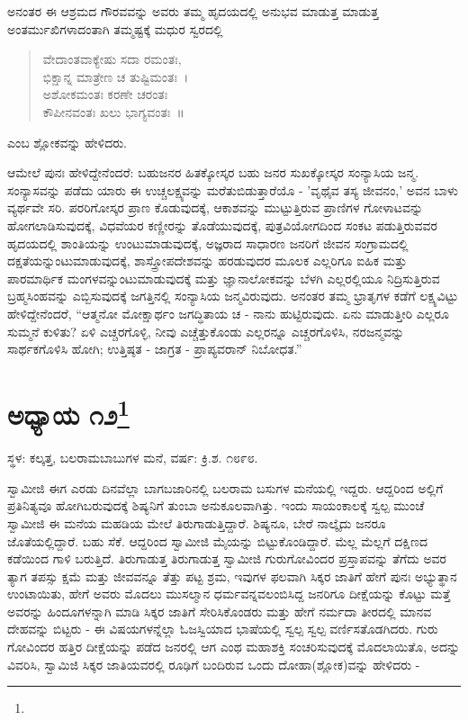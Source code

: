 ಅನಂತರ ಈ ಆಶ್ರಮದ ಗೌರವವನ್ನು ಅವರು ತಮ್ಮ ಹೃದಯದಲ್ಲಿ ಅನುಭವ ಮಾಡುತ್ತ ಮಾಡುತ್ತ ಅಂತರ್ಮುಖಿಗಳಾದಂತಾಗಿ ತಮ್ಮಷ್ಟಕ್ಕೆ ಮಧುರ ಸ್ವರದಲ್ಲಿ

\begin{verse}
ವೇದಾಂತವಾಕ್ಯೇಷು ಸದಾ ರಮಂತಃ,\\ಭಿಕ್ಷಾನ್ನ ಮಾತ್ರೇಣ ಚ ತುಷ್ಟಿಮಂತಃ~।\\ಅಶೋಕಮಂತಃ ಕರಣೇ ಚರಂತಃ\\ಕೌಪೀನವಂತಃ ಖಲು ಭಾಗ್ಯವಂತಃ~॥
\end{verse}

ಎಂಬ ಶ್ಲೋಕವನ್ನು ಹೇಳಿದರು.

ಆಮೇಲೆ ಪುನಃ ಹೇಳಿದ್ದೇನೆಂದರೆ: ಬಹುಜನರ ಹಿತಕ್ಕೋಸ್ಕರ ಬಹು ಜನರ ಸುಖಕ್ಕೋಸ್ಕರ ಸಂನ್ಯಾಸಿಯ ಜನ್ಮ. ಸಂನ್ಯಾಸವನ್ನು ಪಡೆದು ಯಾರು ಈ ಉಚ್ಚಲಕ್ಷ್ಯವನ್ನು ಮರೆತುಬಿಡುತ್ತಾರೆಯೊ - 'ವೃಥೈವ ತಸ್ಯ ಜೀವನಂ,' ಅವನ ಬಾಳು ವ್ಯರ್ಥವೇ ಸರಿ. ಪರರಿಗೋಸ್ಕರ ಪ್ರಾಣ ಕೊಡುವುದಕ್ಕೆ, ಆಕಾಶವನ್ನು ಮುಟ್ಟುತ್ತಿರುವ ಪ್ರಾಣಿಗಳ ಗೋಳಾಟವನ್ನು ಹೋಗಲಾಡಿಸುವುದಕ್ಕೆ, ವಿಧವೆಯರ ಕಣ್ಣೀರನ್ನು ತೊಡೆಯುವುದಕ್ಕೆ, ಪುತ್ರವಿಯೋಗದಿಂದ ಸಂಕಟ ಪಡುತ್ತಿರುವವರ ಹೃದಯದಲ್ಲಿ ಶಾಂತಿಯನ್ನು ಉಂಟುಮಾಡುವುದಕ್ಕೆ, ಅಜ್ಞರಾದ ಸಾಧಾರಣ ಜನರಿಗೆ ಜೀವನ ಸಂಗ್ರಾಮದಲ್ಲಿ ದಕ್ಷತೆಯನ್ನುಂಟುಮಾಡುವುದಕ್ಕೆ, ಶಾಸ್ತ್ರೋಪದೇಶವನ್ನು ಹರಡುವುದರ ಮೂಲಕ ಎಲ್ಲರಿಗೂ ಐಹಿಕ ಮತ್ತು ಪಾರಮಾರ್ಥಿಕ ಮಂಗಳವನ್ನುಂಟುಮಾಡುವುದಕ್ಕೆ ಮತ್ತು ಜ್ಞಾನಾಲೋಕವನ್ನು ಬೆಳಗಿ ಎಲ್ಲರಲ್ಲಿಯೂ ನಿದ್ರಿಸುತ್ತಿರುವ ಬ್ರಹ್ಮಸಿಂಹವನ್ನು ಎಬ್ಬಿಸುವುದಕ್ಕೆ ಜಗತ್ತಿನಲ್ಲಿ ಸಂನ್ಯಾಸಿಯ ಜನ್ಮವಿರುವುದು. ಅನಂತರ ತಮ್ಮ ಭ್ರಾತೃಗಳ ಕಡೆಗೆ ಲಕ್ಷ್ಯವಿಟ್ಟು ಹೇಳಿದ್ದೇನೆಂದರೆ, “ಆತ್ಮನೋ ಮೋಕ್ಷಾರ್ಥಂ ಜಗದ್ಧಿತಾಯ ಚ - ನಾನು ಹುಟ್ಟಿರುವುದು. ಏನು ಮಾಡುತ್ತೀರಿ ಎಲ್ಲರೂ ಸುಮ್ಮನೆ ಕುಳಿತು? ಏಳಿ ಎಚ್ಚರಗೊಳ್ಳಿ, ನೀವು ಎಚ್ಚೆತ್ತುಕೊಂಡು ಎಲ್ಲರನ್ನೂ ಎಚ್ಚರಗೊಳಿಸಿ, ನರಜನ್ಮವನ್ನು ಸಾರ್ಥಕಗೊಳಿಸಿ ಹೋಗಿ; ಉತ್ತಿಷ್ಠತ - ಜಾಗ್ರತ - ಪ್ರಾಪ್ಯವರಾನ್ ನಿಬೋಧತ.”

\newpage

\chapter[ಅಧ್ಯಾಯ ೧೨]{ಅಧ್ಯಾಯ ೧೨\protect\footnote{}}

\begin{center}
ಸ್ಥಳ: ಕಲ್ಕತ್ತ, ಬಲರಾಮಬಾಬುಗಳ ಮನೆ, ವರ್ಷ: ಕ್ರಿ.ಶ. ೧೮೯೮.
\end{center}

ಸ್ವಾಮೀಜಿ ಈಗ ಎರಡು ದಿನವೆಲ್ಲಾ ಬಾಗಬಜಾರಿನಲ್ಲಿ ಬಲರಾಮ ಬಸುಗಳ ಮನೆಯಲ್ಲಿ ಇದ್ದರು. ಆದ್ದರಿಂದ ಅಲ್ಲಿಗೆ ಪ್ರತಿನಿತ್ಯವೂ ಹೋಗಿಬರುವುದಕ್ಕೆ ಶಿಷ್ಯನಿಗೆ ತುಂಬಾ ಅನುಕೂಲವಾಗಿತ್ತು. ಇಂದು ಸಾಯಂಕಾಲಕ್ಕೆ ಸ್ವಲ್ಪ ಮುಂಚೆ ಸ್ವಾಮೀಜಿ ಈ ಮನೆಯ ಮಹಡಿಯ ಮೇಲೆ ತಿರುಗಾಡುತ್ತಿದ್ದಾರೆ. ಶಿಷ್ಯನೂ, ಬೇರೆ ನಾಲ್ಕೈದು ಜನರೂ ಜೊತೆಯಲ್ಲಿದ್ದಾರೆ. ಬಹು ಸೆಕೆ. ಆದ್ದರಿಂದ ಸ್ವಾಮೀಜಿ ಮೈಯನ್ನು ಬಿಟ್ಟುಕೊಂಡಿದ್ದಾರೆ. ಮೆಲ್ಲ ಮೆಲ್ಲಗೆ ದಕ್ಷಿಣದ ಕಡೆಯಿಂದ ಗಾಳಿ ಬರುತ್ತಿದೆ. ತಿರುಗಾಡುತ್ತ ತಿರುಗಾಡುತ್ತ ಸ್ವಾಮೀಜಿ ಗುರುಗೋವಿಂದರ ಪ್ರಸ್ತಾಪವನ್ನು ತೆಗೆದು ಅವರ ತ್ಯಾಗ ತಪಸ್ಸು ಕ್ಷಮೆ ಮತ್ತು ಜೀವವನ್ನೂ ತೆತ್ತು ಪಟ್ಟ ಶ್ರಮ, ಇವುಗಳ ಫಲವಾಗಿ ಸಿಕ್ಕರ ಜಾತಿಗೆ ಹೇಗೆ ಪುನಃ ಅಭ್ಯುತ್ಥಾನ ಉಂಟಾಯಿತು, ಹೇಗೆ ಅವರು ಮೊದಲು ಮುಸಲ್ಮಾನ ಧರ್ಮವನ್ನವಲಂಬಿಸಿದ್ದ ಜನರಿಗೂ ದೀಕ್ಷೆಯನ್ನು ಕೊಟ್ಟು ಮತ್ತೆ ಅವರನ್ನು ಹಿಂದೂಗಳನ್ನಾಗಿ ಮಾಡಿ ಸಿಕ್ಕರ ಜಾತಿಗೆ ಸೇರಿಸಿಕೊಂಡರು ಮತ್ತು ಹೇಗೆ ನರ್ಮದಾ ತೀರದಲ್ಲಿ ಮಾನವ ದೇಹವನ್ನು ಬಿಟ್ಟರು - ಈ ವಿಷಯಗಳನ್ನೆಲ್ಲಾ ಓಜಸ್ವಿಯಾದ ಭಾಷೆಯಲ್ಲಿ ಸ್ವಲ್ಪ ಸ್ವಲ್ಪ ವರ್ಣಿಸತೊಡಗಿದರು. ಗುರು ಗೋವಿಂದರ ಹತ್ತಿರ ದೀಕ್ಷೆಯನ್ನು ಪಡೆದ ಜನರಲ್ಲಿ ಆಗ ಎಂಥ ಮಹಾಶಕ್ತಿ ಸಂಚರಿಸುವುದಕ್ಕೆ ಮೊದಲಾಯಿತೊ, ಅದನ್ನು ವಿವರಿಸಿ, ಸ್ವಾಮಿಜಿ ಸಿಕ್ಕರ ಜಾತಿಯವರಲ್ಲಿ ರೂಢಿಗೆ ಬಂದಿರುವ ಒಂದು ದೋಹಾ(ಶ್ಲೋಕ)ವನ್ನು ಹೇಳಿದರು -

